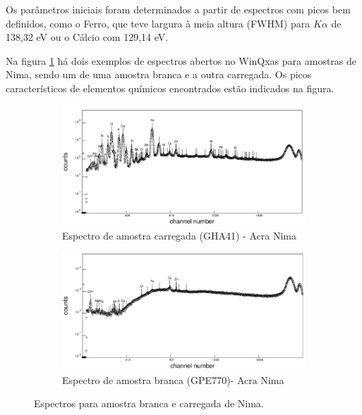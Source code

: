Os parâmetros iniciais foram determinados a partir de espectros com picos 
bem definidos, como o Ferro, que teve largura à meia altura (FWHM) para 
$K\alpha$ de 138,32 eV ou o Cálcio com 129,14 eV.

Na figura \ref{fig:winqxas} há dois exemplos de espectros abertos no WinQxas
para amostras de Nima, sendo um de uma amostra branca e a outra carregada. Os picos 
característicos de elementos químicos encontrados estão indicados na figura.

\begin{figure}[H]
  \centering
  \begin{subfigure}[b]{0.7\textwidth}
    \includegraphics[width=\textwidth]{../inputs/images/winqxas/GHA41editado.pdf}
    \caption{Espectro de amostra carregada (GHA41) - Acra Nima}
  \end{subfigure}
  \begin{subfigure}[b]{0.7\textwidth}
    \includegraphics[width=\textwidth]{../inputs/images/winqxas/GPE770editado.pdf}
     \caption{Espectro de amostra branca (GPE770)- Acra Nima}
  \end{subfigure}
  \caption{Espectros para amostra branca e carregada de Nima. \label{fig:winqxas}}
\end{figure}


